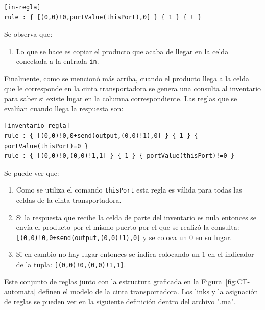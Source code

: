 \documentclass[10pt]{article}
\begin{document}
\begin{minipage}{1\textwidth}
	\centering
	\begin{lstlisting}
[in-regla]
rule : { [(0,0)!0,portValue(thisPort),0] } { 1 } { t }
	\end{lstlisting}
\end{minipage}

Se observa que:
\begin{enumerate}
\item Lo que se hace es copiar el producto que acaba de llegar en la celda conectada a la entrada \texttt{in}.
\end{enumerate}

Finalmente, como se mencionó más arriba, cuando el producto llega a la celda que le corresponde en la cinta transportadora se genera una consulta al inventario para saber si existe lugar en la columna correspondiente. Las reglas que se evalúan cuando llega la respuesta son:

\begin{minipage}{1\textwidth}
	\centering
	\begin{lstlisting}
[inventario-regla]
rule : { [(0,0)!0,0+send(output,(0,0)!1),0] } { 1 } { portValue(thisPort)=0 }
rule : { [(0,0)!0,(0,0)!1,1] } { 1 } { portValue(thisPort)!=0 }
	\end{lstlisting}
\end{minipage}

Se puede ver que:
\begin{enumerate}
 \item Como se utiliza el comando \texttt{thisPort} esta regla es válida para todas las celdas de la cinta transportadora. 
 \item Si la respuesta que recibe la celda de parte del inventario es nula entonces se envía el producto por el mismo puerto por el que se realizó la consulta: \texttt{[(0,0)!0,0+send(output,(0,0)!1),0]} y se coloca un $0$ en su lugar.
 \item Si en cambio no hay lugar entonces se indica colocando un $1$ en el indicador de la tupla: \texttt{[(0,0)!0,(0,0)!1,1]}.
\end{enumerate}

Este conjunto de reglas junto con la estructura graficada en la Figura~\ref{fig:CT-automata} definen el modelo de la cinta transportadora. Los links y la asignación de reglas se pueden ver en la siguiente definición dentro del archivo ".ma".
\end{document}
